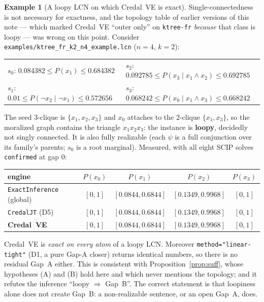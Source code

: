 \documentclass[11pt]{article}
\theoremstyle{definition}
\newtheorem{example}{Example}
\begin{document}
\begin{example}[A loopy LCN on which Credal~VE is exact]\label{ex:loopyexact}
Single-connectedness is not necessary for exactness, and the topology table of earlier versions of
this note --- which marked Credal~VE ``outer only'' on \texttt{ktree-fr} \emph{because} that class is
loopy --- was wrong on this point. Consider
\texttt{examples/ktree\_fr\_k2\_n4\_example.lcn} ($n{=}4$, $k{=}2$):
\begin{center}\small
\begin{tabular}{@{}ll@{}}
$s_0$: $0.084382\le P(x_1)\le0.684382$ &
$s_2$: $0.092785\le P(x_3\mid x_1\wedge x_2)\le0.692785$\\
$s_1$: $0.01\le P(\lnot x_2\mid\lnot x_1)\le0.572656$ &
$s_3$: $0.068242\le P(x_0\mid x_1\wedge x_3)\le0.668242$
\end{tabular}
\end{center}
The seed $3$-clique is $\{x_1,x_2,x_3\}$ and $x_0$ attaches to the $2$-clique $\{x_1,x_3\}$, so the
moralized graph contains the triangle $x_1x_2x_3$: the instance is \textbf{loopy}, decidedly not
singly connected. It is also fully realizable (each $\psi$ is a full conjunction over its family's
parents; $s_0$ is a root marginal). Measured, with all eight SCIP solves \texttt{confirmed} at gap
$0$:
\begin{center}\small
\begin{tabular}{@{}lcccc@{}}
\toprule
engine & $P(x_0)$ & $P(x_1)$ & $P(x_2)$ & $P(x_3)$ \\
\midrule
\texttt{ExactInference} (global) & $[0,1]$ & $[0.0844,0.6844]$ & $[0.1349,0.9968]$ & $[0,1]$ \\
\texttt{CredalJT} (D5)           & $[0,1]$ & $[0.0844,0.6844]$ & $[0.1349,0.9968]$ & $[0,1]$ \\
\textbf{Credal~VE}               & $[0,1]$ & $[0.0844,0.6844]$ & $[0.1349,0.9968]$ & $[0,1]$ \\
\bottomrule
\end{tabular}
\end{center}
Credal~VE is \emph{exact on every atom} of a loopy LCN. Moreover \texttt{method="linear-tight"} (D1,
a pure Gap-A closer) returns identical numbers, so there is no residual Gap~A either. This is
consistent with Proposition~\ref{prop:suff}, whose hypotheses (A) and (B) hold here and which never
mentions the topology; and it refutes the inference ``loopy $\Rightarrow$ Gap~B''. The correct
statement is that loopiness alone does not create Gap~B: a non-realizable sentence, or an open
Gap~A, does.
\end{example}
\end{document}
